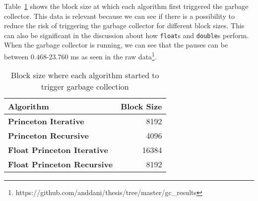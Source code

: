 Table~\ref{tab:result:gc:trigger:2} shows the block size at which each algorithm first triggered the garbage collector. This data is relevant because we can see if there is a possibility to reduce the risk of triggering the garbage collector for different block sizes. This can also be significant in the discussion about how \texttt{float}s and \texttt{double}s perform. When the garbage collector is running, we can see that the pauses can be between 0.468-23.760 ms as seen in the raw data\footnote{https://github.com/anddani/thesis/tree/master/gc\_results}.

\ifrelease
\begin{table}[H]
    \centering
    \caption{Block size where each algorithm started to trigger garbage collection}
    \label{tab:result:gc:trigger:2}
    \begin{tabular}{lr}\toprule
        \textbf{Algorithm} & \textbf{Block Size}\\\midrule
        \textbf{Princeton Iterative} & 8192\\
        \textbf{Princeton Recursive} & 4096\\
        \textbf{Float Princeton Iterative} & 16384\\
        \textbf{Float Princeton Recursive} & 8192\\
        \bottomrule
    \end{tabular}
\end{table}
\fi

